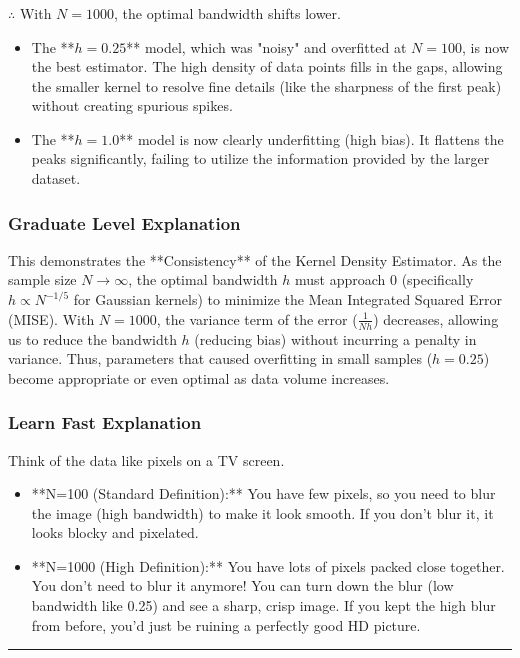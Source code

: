 \documentclass{article}
\begin{document}
\subsubsection*{\normalfont}{$\therefore$ }
With $N=1000$, the optimal bandwidth shifts lower.
\begin{itemize}
    \item The **$h=0.25$** model, which was "noisy" and overfitted at $N=100$, is now the best estimator. The high density of data points fills in the gaps, allowing the smaller kernel to resolve fine details (like the sharpness of the first peak) without creating spurious spikes.
    \item The **$h=1.0$** model is now clearly underfitting (high bias). It flattens the peaks significantly, failing to utilize the information provided by the larger dataset.
\end{itemize}

\subsubsection*{Graduate Level Explanation}
This demonstrates the **Consistency** of the Kernel Density Estimator. As the sample size $N \to \infty$, the optimal bandwidth $h$ must approach $0$ (specifically $h \propto N^{-1/5}$ for Gaussian kernels) to minimize the Mean Integrated Squared Error (MISE).
With $N=1000$, the variance term of the error ($\frac{1}{Nh}$) decreases, allowing us to reduce the bandwidth $h$ (reducing bias) without incurring a penalty in variance. Thus, parameters that caused overfitting in small samples ($h=0.25$) become appropriate or even optimal as data volume increases.

\subsubsection*{Learn Fast Explanation}
Think of the data like pixels on a TV screen.
\begin{itemize}
    \item **N=100 (Standard Definition):** You have few pixels, so you need to blur the image (high bandwidth) to make it look smooth. If you don't blur it, it looks blocky and pixelated.
    \item **N=1000 (High Definition):** You have lots of pixels packed close together. You don't need to blur it anymore! You can turn down the blur (low bandwidth like 0.25) and see a sharp, crisp image. If you kept the high blur from before, you'd just be ruining a perfectly good HD picture.
\end{itemize}

\noindent\rule{\textwidth}{0.4pt}\\

\newpage
\end{document}
